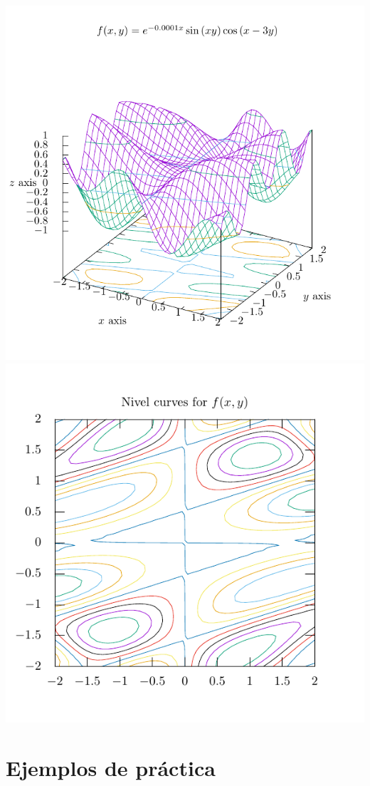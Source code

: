 \documentclass[11.5pt,a4paper]{article}
\begin{document}
\includegraphics[scale=0.75]{ejemplo10.pdf}
\includegraphics[scale=0.75]{ejemplo11.pdf}

\section{Ejemplos de práctica}
\end{document}

